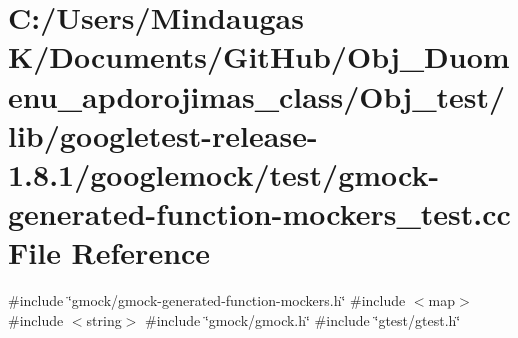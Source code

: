 \hypertarget{_obj__test_2lib_2googletest-release-1_88_81_2googlemock_2test_2gmock-generated-function-mockers__test_8cc}{}\section{C\+:/\+Users/\+Mindaugas K/\+Documents/\+Git\+Hub/\+Obj\+\_\+\+Duomenu\+\_\+apdorojimas\+\_\+class/\+Obj\+\_\+test/lib/googletest-\/release-\/1.8.1/googlemock/test/gmock-\/generated-\/function-\/mockers\+\_\+test.cc File Reference}
\label{_obj__test_2lib_2googletest-release-1_88_81_2googlemock_2test_2gmock-generated-function-mockers__test_8cc}
{\ttfamily \#include \char`\"{}gmock/gmock-\/generated-\/function-\/mockers.\+h\char`\"{}}\newline
{\ttfamily \#include $<$map$>$}\newline
{\ttfamily \#include $<$string$>$}\newline
{\ttfamily \#include \char`\"{}gmock/gmock.\+h\char`\"{}}\newline
{\ttfamily \#include \char`\"{}gtest/gtest.\+h\char`\"{}}\newline
